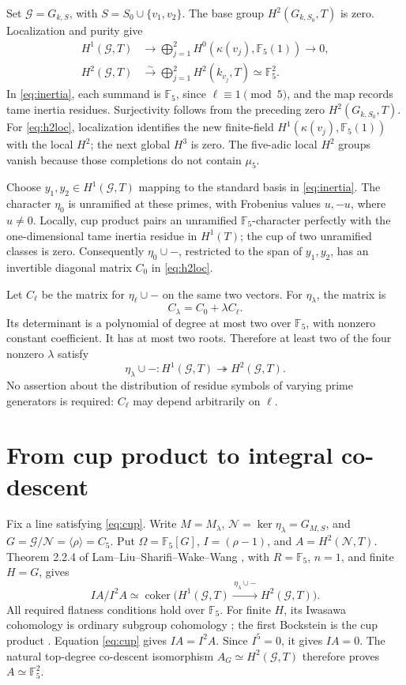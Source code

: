 \documentclass[11pt]{article}
\theoremstyle{remark}\newtheorem{remark}[theorem]{Remark}
\newcommand{\F}{\mathbb F}\newcommand{\Gal}{\operatorname{Gal}}
\newcommand{\coker}{\operatorname{coker}}
\begin{document}
Set \(\mathcal G=G_{k,S}\), with \(S=S_0\cup\{v_1,v_2\}\).
The base group \(H^2(G_{k,S_0},T)\) is zero. Localization and purity give
\begin{align}
 H^1(\mathcal G,T)&\longrightarrow
 \bigoplus_{j=1}^2 H^0(\kappa(v_j),\F_5(1))\longrightarrow0,\label{eq:inertia}\\
 H^2(\mathcal G,T)&\xrightarrow{\sim}
 \bigoplus_{j=1}^2 H^2(k_{v_j},T)\simeq\F_5^2.\label{eq:h2loc}
\end{align}
In \eqref{eq:inertia}, each summand is \(\F_5\), since
\(\ell\equiv1\pmod5\), and the map records tame inertia residues.
Surjectivity follows from the preceding zero \(H^2(G_{k,S_0},T)\).
For \eqref{eq:h2loc}, localization identifies the new finite-field
\(H^1(\kappa(v_j),\F_5(1))\) with the local \(H^2\); the next global
\(H^3\) is zero. The five-adic local \(H^2\) groups vanish because those
completions do not contain \(\mu_5\).

Choose \(y_1,y_2\in H^1(\mathcal G,T)\) mapping to the standard basis in
\eqref{eq:inertia}. The character \(\eta_0\) is unramified at these primes,
with Frobenius values \(u,-u\), where \(u\ne0\). Locally, cup product pairs
an unramified \(\F_5\)-character perfectly with the one-dimensional tame
inertia residue in \(H^1(T)\); the cup of two unramified classes is zero.
Consequently \(\eta_0\cup-\), restricted to the span of \(y_1,y_2\), has
an invertible diagonal matrix \(C_0\) in \eqref{eq:h2loc}.

Let \(C_\ell\) be the matrix for \(\eta_\ell\cup-\) on the same two
vectors. For \(\eta_\lambda\), the matrix is
\[
 C_\lambda=C_0+\lambda C_\ell.
\]
Its determinant is a polynomial of degree at most two over \(\F_5\), with
nonzero constant coefficient. It has at most two roots. Therefore at least
two of the four nonzero \(\lambda\) satisfy
\begin{equation}\label{eq:cup}
 \eta_\lambda\cup-:H^1(\mathcal G,T)\twoheadrightarrow H^2(\mathcal G,T).
\end{equation}
No assertion about the distribution of residue symbols of varying prime
generators is required: \(C_\ell\) may depend arbitrarily on \(\ell\).

\section{From cup product to integral co-descent}
Fix a line satisfying \eqref{eq:cup}. Write \(M=M_\lambda\),
\(\mathcal N=\ker\eta_\lambda=G_{M,S}\), and
\(G=\mathcal G/\mathcal N=\langle\rho\rangle=C_5\).
Put \(\Omega=\F_5[G]\), \(I=(\rho-1)\), and \(A=H^2(\mathcal N,T)\).
Theorem 2.2.4 of Lam--Liu--Sharifi--Wake--Wang \cite{LLSWW}, with
\(R=\F_5\), \(n=1\), and finite \(H=G\), gives
\[
 IA/I^2A\simeq\coker\bigl(H^1(\mathcal G,T)
 \xrightarrow{\,\eta_\lambda\cup-\,}H^2(\mathcal G,T)\bigr).
\]
All required flatness conditions hold over \(\F_5\).
For finite \(H\), its Iwasawa cohomology is ordinary subgroup cohomology
\cite[Remark 2.2.1]{LLSWW}; the first Bockstein is the cup product
\cite[Proposition 2.3.3]{LLSWW}.
Equation \eqref{eq:cup} gives \(IA=I^2A\). Since \(I^5=0\), it gives
\(IA=0\). The natural top-degree co-descent isomorphism
\(A_G\simeq H^2(\mathcal G,T)\) therefore proves \(A\simeq\F_5^2\).
\end{document}
